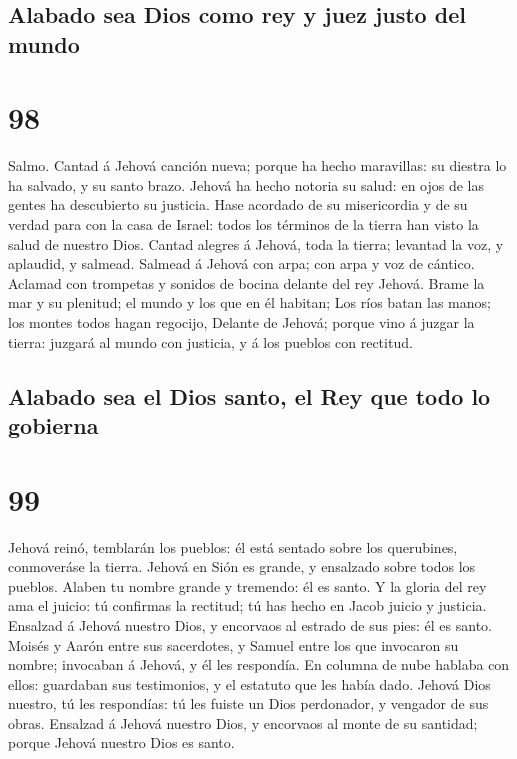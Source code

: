 \hypertarget{alabado-sea-dios-como-rey-y-juez-justo-del-mundo}{%
\subsection{Alabado sea Dios como rey y juez justo del
mundo}\label{alabado-sea-dios-como-rey-y-juez-justo-del-mundo}}

\hypertarget{section-97}{%
\section{98}\label{section-97}}

 Salmo. Cantad á Jehová canción nueva; porque ha hecho
maravillas: su diestra lo ha salvado, y su santo brazo. 
Jehová ha hecho notoria su salud: en ojos de las gentes ha descubierto
su justicia.  Hase acordado de su misericordia y de su
verdad para con la casa de Israel: todos los términos de la tierra han
visto la salud de nuestro Dios.  Cantad alegres á Jehová,
toda la tierra; levantad la voz, y aplaudid, y salmead. 
Salmead á Jehová con arpa; con arpa y voz de cántico. 
Aclamad con trompetas y sonidos de bocina delante del rey Jehová.
 Brame la mar y su plenitud; el mundo y los que en él
habitan;  Los ríos batan las manos; los montes todos hagan
regocijo,  Delante de Jehová; porque vino á juzgar la
tierra: juzgará al mundo con justicia, y á los pueblos con rectitud.

\hypertarget{alabado-sea-el-dios-santo-el-rey-que-todo-lo-gobierna}{%
\subsection{Alabado sea el Dios santo, el Rey que todo lo
gobierna}\label{alabado-sea-el-dios-santo-el-rey-que-todo-lo-gobierna}}

\hypertarget{section-98}{%
\section{99}\label{section-98}}

 Jehová reinó, temblarán los pueblos: él está sentado
sobre los querubines, conmoveráse la tierra.  Jehová en
Sión es grande, y ensalzado sobre todos los pueblos. 
Alaben tu nombre grande y tremendo: él es santo.  Y la
gloria del rey ama el juicio: tú confirmas la rectitud; tú has hecho en
Jacob juicio y justicia.  Ensalzad á Jehová nuestro Dios,
y encorvaos al estrado de sus pies: él es santo.  Moisés y
Aarón entre sus sacerdotes, y Samuel entre los que invocaron su nombre;
invocaban á Jehová, y él les respondía.  En columna de
nube hablaba con ellos: guardaban sus testimonios, y el estatuto que les
había dado.  Jehová Dios nuestro, tú les respondías: tú
les fuiste un Dios perdonador, y vengador de sus obras. 
Ensalzad á Jehová nuestro Dios, y encorvaos al monte de su santidad;
porque Jehová nuestro Dios es santo.

